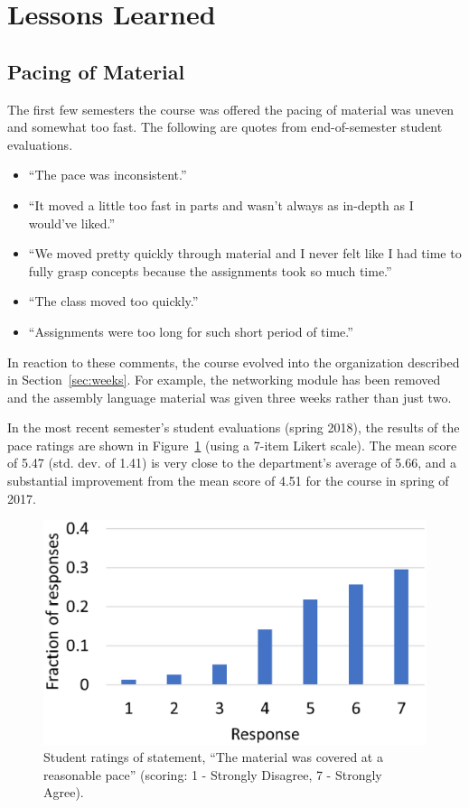 \section{Lessons Learned}
\label{sec:lessons}


\subsection{Pacing of Material}


The first few semesters the course was offered the pacing of material was uneven and somewhat too fast.  The following are quotes from end-of-semester student evaluations.
\begin{itemize}
\item ``The pace was inconsistent.''
\item ``It moved a little too fast in parts and wasn't always as
in-depth as I would've liked.''
\item ``We moved pretty quickly through material and I never felt like I had
time to fully grasp concepts because the assignments took so much time.''
\item ``The class moved too quickly.''
\item ``Assignments were too long for such short period of time.''
\end{itemize}

In reaction to these comments, the course evolved into the organization described in Section~\ref{sec:weeks}.  For example, the networking module has been removed and the assembly language material was given three weeks rather than just two.

In the most recent semester's student evaluations (spring 2018), the results of the pace ratings are shown in Figure~\ref{fig:pace} (using a 7-item Likert scale). The mean score of 5.47 (std. dev. of 1.41) is very close to the department's average of 5.66, and a substantial improvement from the mean score of 4.51 for the course in spring of 2017.

\begin{figure}[ht]
\centering
\includegraphics[width=\columnwidth]{pace}
\caption{Student ratings of statement, ``The material was covered
at a reasonable pace''  (scoring: 1 - Strongly Disagree, 7 - Strongly Agree).}
\label{fig:pace}
\end{figure}

